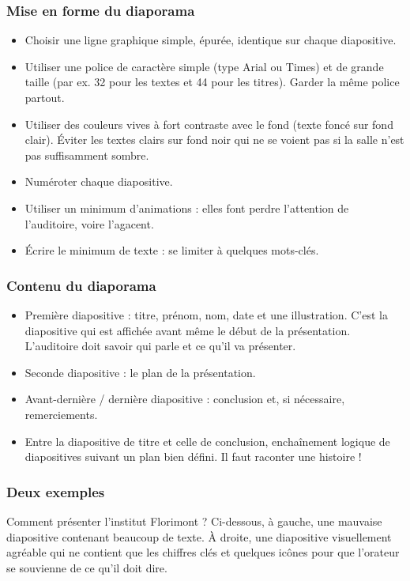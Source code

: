 \subsubsection*{Mise en forme du diaporama}

\begin{itemize}
\item Choisir une ligne graphique simple, épurée, identique sur chaque diapositive.
\item Utiliser une police de caractère simple (type Arial ou Times) et de grande taille (par ex. 32 pour les textes et 44 pour les titres). Garder la même police partout.
\item Utiliser des couleurs vives à fort contraste avec le fond (texte foncé sur fond clair). Éviter les textes clairs sur fond noir qui ne se voient pas si la salle n'est pas suffisamment sombre.
\item Numéroter chaque diapositive.
\item Utiliser un minimum d'animations : elles font perdre l'attention de l'auditoire, voire l'agacent.
\item Écrire le minimum de texte : se limiter à quelques mots-clés.
\end{itemize}

\subsubsection*{Contenu du diaporama}

\begin{itemize}
\item Première diapositive : titre, prénom, nom, date et une illustration. C'est la diapositive qui est affichée avant même le début de la présentation. L'auditoire doit savoir qui parle et ce qu'il va présenter.
\item Seconde diapositive : le plan de la présentation.
\item Avant-dernière / dernière diapositive : conclusion et, si nécessaire, remerciements.
\item Entre la diapositive de titre et celle de conclusion, enchaînement logique de diapositives suivant un plan bien défini. Il faut raconter une histoire !
\end{itemize}

\subsubsection*{Deux exemples}

Comment présenter l'institut Florimont ? Ci-dessous, à gauche, une mauvaise diapositive contenant beaucoup de texte. À droite, une diapositive visuellement agréable qui ne contient que les chiffres clés et quelques icônes pour que l'orateur se souvienne de ce qu'il doit dire.


